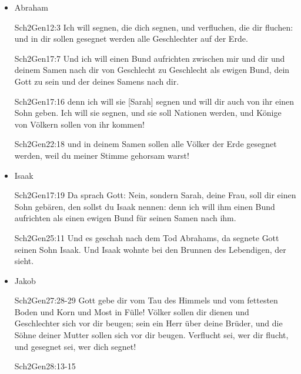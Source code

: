 \begin{enumerate}
    \begin{itemize}
        \item Abraham
         \begin{bibeltext}{Sch2}{Gen}{12:3}
            Ich will segnen, die  dich segnen, und verfluchen, die dir fluchen: und in dir sollen gesegnet werden alle Geschlechter auf der Erde.
        \end{bibeltext}
        \begin{bibeltext}{Sch2}{Gen}{17:7}
            Und ich will einen Bund aufrichten zwischen mir und dir und deinem Samen nach dir von Geschlecht zu Geschlecht als ewigen Bund, dein Gott zu sein und der deines Samens nach dir. 
        \end{bibeltext}
        \begin{bibeltext}{Sch2}{Gen}{17:16}
            denn ich will sie [Sarah] segnen und will dir auch von ihr einen Sohn geben. Ich will sie segnen, und sie soll Nationen werden, und Könige von Völkern sollen von ihr kommen!
        \end{bibeltext}
        \begin{bibeltext}{Sch2}{Gen}{22:18}
            und in deinem Samen sollen alle Völker der Erde gesegnet werden, weil du meiner Stimme gehorsam warst!
        \end{bibeltext}
        \item Isaak
        \begin{bibeltext}{Sch2}{Gen}{17:19}
            Da sprach Gott: Nein, sondern Sarah, deine Frau, soll dir einen Sohn gebären, den sollst du Isaak nennen: denn ich will ihm einen Bund aufrichten als einen ewigen Bund für seinen Samen nach ihm.
        \end{bibeltext}
        \begin{bibeltext}{Sch2}{Gen}{25:11}
            Und es geschah nach dem Tod Abrahams, da segnete Gott seinen Sohn Isaak. Und Isaak wohnte bei den \glqq Brunnen des Lebendigen, der sieht\grqq.
        \end{bibeltext}
        \item Jakob
        \begin{bibeltext}{Sch2}{Gen}{27:28-29}
            Gott gebe dir vom Tau des Himmels und vom fettesten Boden und Korn und Most in Fülle! Völker sollen dir dienen und Geschlechter sich vor dir beugen; sein ein Herr über deine Brüder, und die Söhne deiner Mutter sollen sich vor dir beugen. Verflucht sei, wer dir flucht, und gesegnet sei, wer dich segnet!
        \end{bibeltext}
        \begin{bibeltext}{Sch2}{Gen}{28:13-15}

\end{bibeltext}
\end{itemize}
\end{enumerate}
